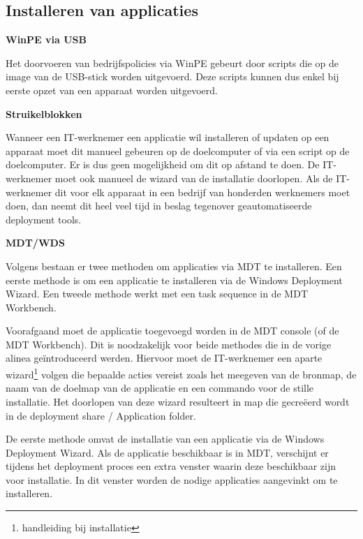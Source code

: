 \subsection{Installeren van applicaties}



\textbf{WinPE via USB}

Het doorvoeren van bedrijfspolicies via WinPE gebeurt door scripts die op de image van de USB-stick worden uitgevoerd. Deze scripts kunnen dus enkel bij eerste opzet van een apparaat worden uitgevoerd.



\textbf{Struikelblokken}

Wanneer een IT-werknemer een applicatie wil installeren of updaten op een apparaat moet dit manueel gebeuren op de doelcomputer of via een script op de doelcomputer. Er is dus geen mogelijkheid om dit op afstand te doen. De IT-werknemer moet ook manueel de wizard van de installatie doorlopen. Als de IT-werknemer dit voor elk apparaat in een bedrijf van honderden werknemers moet doen, dan neemt dit heel veel tijd in beslag tegenover geautomatiseerde deployment tools.



\textbf{MDT/WDS}

Volgens \textcite{RDRIT2022} bestaan er twee methoden om applicaties via MDT te installeren. Een eerste methode is om een applicatie te installeren via de Windows Deployment Wizard. Een tweede methode werkt met een task sequence in de MDT Workbench.

Voorafgaand moet de applicatie toegevoegd worden in de MDT console (of de MDT Workbench). Dit is noodzakelijk voor beide methodes die in de vorige alinea geïntroduceerd werden. Hiervoor moet de IT-werknemer een aparte wizard\footnote{handleiding bij installatie} volgen die bepaalde acties vereist zoals het meegeven van de bronmap, de naam van de doelmap van de applicatie en een commando voor de stille installatie. Het doorlopen van deze wizard resulteert in map die gecreëerd wordt in de deployment share / Application folder.

De eerste methode omvat de installatie van een applicatie via de Windows Deployment Wizard. Als de applicatie beschikbaar is in MDT, verschijnt er tijdens het deployment proces een extra venster waarin deze beschikbaar zijn voor installatie. In dit venster worden de nodige applicaties aangevinkt om te installeren.


